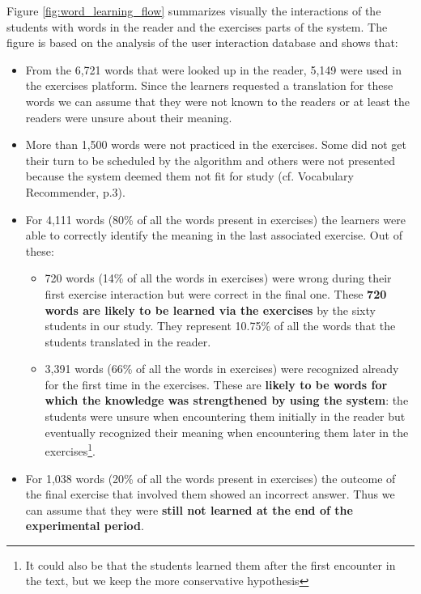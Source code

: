   Figure \ref{fig:word_learning_flow} summarizes visually the interactions of the students with words in the reader and the exercises parts of the system. The figure is based on the analysis of the user interaction database and shows that: 

  \begin{itemize}
    \item From the 6,721 words that were looked up in the reader, 5,149 were used in the exercises platform. Since the learners requested a translation for these words we can assume that they were not known to the readers or at least the readers were unsure about their meaning. 

    \item More than 1,500 words were not practiced in the exercises. 
    Some did not get their turn to be scheduled by the algorithm and others were not presented because the system deemed them not fit for study (cf. Vocabulary Recommender, p.3). 

    \item For 4,111 words (80\% of all the words present in exercises) the learners were able to correctly identify the meaning in the last associated exercise. Out of these: 

    \begin{itemize}
      \item 720 words (14\% of all the words in exercises) were wrong during their first exercise interaction but were correct in the final one. These {\bf 720 words are likely to be learned via the exercises} by the sixty students in our study. They represent 10.75\% of all the words that the students translated in the reader.

      \item 3,391 words (66\% of all the words in exercises) were recognized already for the first time in the exercises. These are {\bf likely to be words for which the knowledge was strengthened by using the system}: the students were unsure when encountering them initially in the reader but eventually recognized their meaning when encountering them later in the exercises\footnote{It could also be that the students learned them after the first encounter in the text, but we keep the more conservative hypothesis}. 
    \end{itemize}

  \item For 1,038 words (20\% of all the words present in exercises) the outcome of the final exercise that involved them showed an incorrect answer. Thus we can assume that they were {\bf still not learned at the end of the experimental period}.

  \end{itemize}

